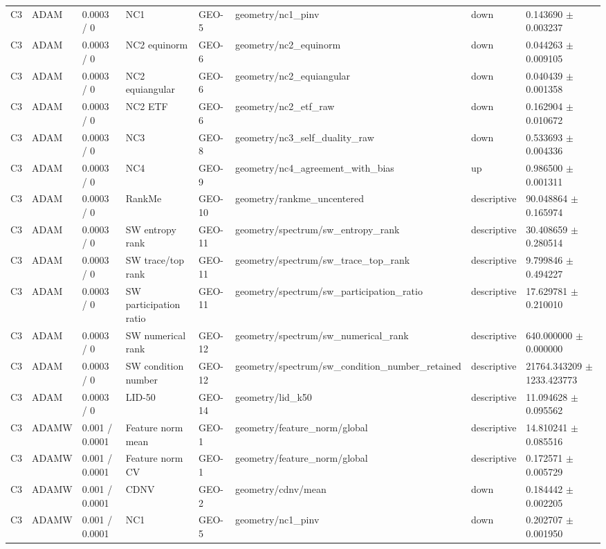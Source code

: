 \begin{longtable}{llllllll}
C3 & ADAM & 0.0003 / 0 & NC1 & GEO-5 & geometry/nc1\_pinv & down & 0.143690 $\pm$ 0.003237 \\
C3 & ADAM & 0.0003 / 0 & NC2 equinorm & GEO-6 & geometry/nc2\_equinorm & down & 0.044263 $\pm$ 0.009105 \\
C3 & ADAM & 0.0003 / 0 & NC2 equiangular & GEO-6 & geometry/nc2\_equiangular & down & 0.040439 $\pm$ 0.001358 \\
C3 & ADAM & 0.0003 / 0 & NC2 ETF & GEO-6 & geometry/nc2\_etf\_raw & down & 0.162904 $\pm$ 0.010672 \\
C3 & ADAM & 0.0003 / 0 & NC3 & GEO-8 & geometry/nc3\_self\_duality\_raw & down & 0.533693 $\pm$ 0.004336 \\
C3 & ADAM & 0.0003 / 0 & NC4 & GEO-9 & geometry/nc4\_agreement\_with\_bias & up & 0.986500 $\pm$ 0.001311 \\
C3 & ADAM & 0.0003 / 0 & RankMe & GEO-10 & geometry/rankme\_uncentered & descriptive & 90.048864 $\pm$ 0.165974 \\
C3 & ADAM & 0.0003 / 0 & SW entropy rank & GEO-11 & geometry/spectrum/sw\_entropy\_rank & descriptive & 30.408659 $\pm$ 0.280514 \\
C3 & ADAM & 0.0003 / 0 & SW trace/top rank & GEO-11 & geometry/spectrum/sw\_trace\_top\_rank & descriptive & 9.799846 $\pm$ 0.494227 \\
C3 & ADAM & 0.0003 / 0 & SW participation ratio & GEO-11 & geometry/spectrum/sw\_participation\_ratio & descriptive & 17.629781 $\pm$ 0.210010 \\
C3 & ADAM & 0.0003 / 0 & SW numerical rank & GEO-12 & geometry/spectrum/sw\_numerical\_rank & descriptive & 640.000000 $\pm$ 0.000000 \\
C3 & ADAM & 0.0003 / 0 & SW condition number & GEO-12 & geometry/spectrum/sw\_condition\_number\_retained & descriptive & 21764.343209 $\pm$ 1233.423773 \\
C3 & ADAM & 0.0003 / 0 & LID-50 & GEO-14 & geometry/lid\_k50 & descriptive & 11.094628 $\pm$ 0.095562 \\
C3 & ADAMW & 0.001 / 0.0001 & Feature norm mean & GEO-1 & geometry/feature\_norm/global & descriptive & 14.810241 $\pm$ 0.085516 \\
C3 & ADAMW & 0.001 / 0.0001 & Feature norm CV & GEO-1 & geometry/feature\_norm/global & descriptive & 0.172571 $\pm$ 0.005729 \\
C3 & ADAMW & 0.001 / 0.0001 & CDNV & GEO-2 & geometry/cdnv/mean & down & 0.184442 $\pm$ 0.002205 \\
C3 & ADAMW & 0.001 / 0.0001 & NC1 & GEO-5 & geometry/nc1\_pinv & down & 0.202707 $\pm$ 0.001950 \\

\end{longtable}
